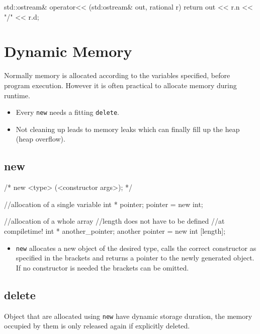 \documentclass[10pt,a4paper]{scrartcl}
\begin{document}
\begin{multicols*}{2}
\begin{TPCpp}
std::ostream& operator<< (std:ostream& out, rational r){
	return out << r.n << "/" << r.d;
}
\end{TPCpp}

\section{Dynamic Memory}
\label{sec:DynamicMemory}

Normally memory is allocated according to the variables specified, before program execution. However it is often practical to allocate memory during runtime.

\begin{itemize}
\item Every \verb+new+ needs a fitting \verb+delete+.
\item Not cleaning up leads to memory leaks which can finally fill up the heap (heap overflow).
\end{itemize}

\subsection{new}
\label{sec:new}

\begin{TPCpp}
/*	
	new <type> (<constructor args>);
*/

//allocation of a single variable
int * pointer;
pointer = new int;

//allocation of a whole array
//length does not have to be defined
//at compiletime!
int * another_pointer;
another pointer = new int [length];
\end{TPCpp}

\begin{itemize}
\item \verb+new+ allocates a new object of the desired type, calls the correct constructor as specified in the brackets and returns a pointer to the newly generated object. If no constructor is needed the brackets can be omitted.
\end{itemize}

\subsection{delete}
\label{sec:delete}

Object that are allocated using \verb+new+ have dynamic storage duration, the memory occupied by them is only released again if explicitly deleted.


\end{multicols*}
\end{document}
